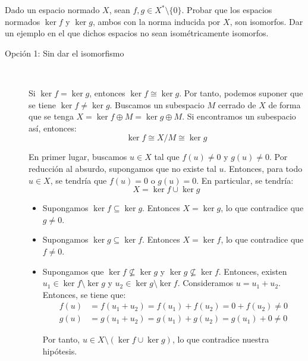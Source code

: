 \begin{ejercicio}
Dado un espacio normado $X$, sean $f, g \in X^* \setminus \{0\}$. Probar que los espacios normados $\ker f$ y $\ker g$, ambos con la norma inducida por $X$, son isomorfos. Dar un ejemplo en el que dichos espacios no sean isométricamente isomorfos.\\

    \begin{description}
        \item[Opción 1: Sin dar el isomorfismo]~
        
        Si $\ker f = \ker g$, entonces $\ker f \cong \ker g$. Por tanto, podemos suponer que se tiene $\ker f \neq \ker g$. Buscamos un subespacio $M$ cerrado de $X$ de forma que se tenga $X = \ker f \oplus M = \ker g \oplus M$. Si encontramos un subespacio así, entonces:
    \begin{equation*}
        \ker f \cong X / M \cong \ker g
    \end{equation*}

    En primer lugar, buscamos $u\in X$ tal que $f(u)\neq 0$ y $g(u)\neq 0$. Por reducción al absurdo, supongamos que no existe tal $u$. Entonces, para todo $u \in X$, se tendría que $f(u) = 0$ o $g(u) = 0$. En particular, se tendría:
    \begin{equation*}
        X= \ker f \cup \ker g
    \end{equation*}
    \begin{itemize}
        \item Supongamos $\ker f \subseteq \ker g$. Entonces $X= \ker g$, lo que contradice que $g \neq 0$.
        \item Supongamos $\ker g \subseteq \ker f$. Entonces $X= \ker f$, lo que contradice que $f \neq 0$.
        \item Supongamos que $\ker f \not\subseteq \ker g$ y $\ker g \not\subseteq \ker f$. Entonces, existen $u_1 \in \ker f \setminus \ker g$ y $u_2 \in \ker g \setminus \ker f$. Consideramos $u = u_1 + u_2$. Entonces, se tiene que:
        \begin{align*}
            f(u) &= f(u_1 + u_2) = f(u_1) + f(u_2) = 0 + f(u_2) \neq 0\\
            g(u) &= g(u_1 + u_2) = g(u_1) + g(u_2) = g(u_1) + 0 \neq 0
        \end{align*}

        Por tanto, $u\in X\setminus (\ker f \cup \ker g)$, lo que contradice nuestra hipótesis.
    \end{itemize}


\end{description}
\end{ejercicio}
